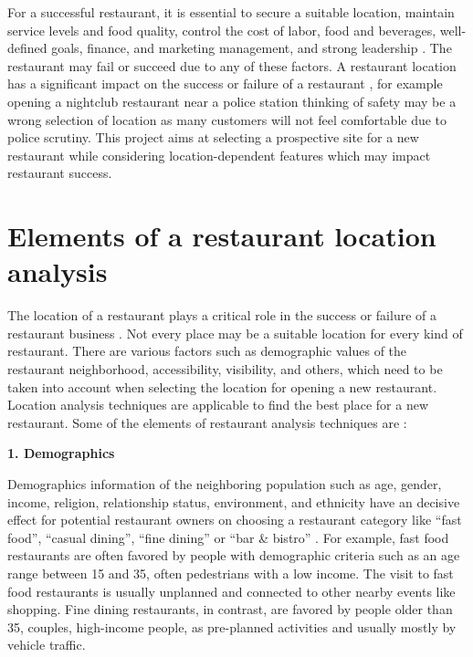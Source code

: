 \documentclass[a4paper, 11pt, oneside]{Thesis}  %
\begin{document}
For a successful restaurant, it is essential to secure a suitable location, maintain service levels and food quality, control the cost of labor, food and beverages, well-defined goals, finance, and marketing management, and strong leadership \cite{Parsa.2005}. The restaurant may fail or succeed due to any of these factors. A restaurant location has a significant impact on the success or failure of a restaurant , for example opening a nightclub restaurant near a police station thinking of safety may be a wrong selection of location as many customers will not feel comfortable due to police scrutiny. This project aims at selecting a prospective site for a new restaurant while considering location-dependent features which may impact restaurant success.

\section{Elements of a restaurant location analysis}
\label{elements}


The location of a restaurant plays a critical role in the success or failure of a restaurant business \cite{Parsa.2005} \cite{Tzeng.2002} \cite{Camillo.2008}. Not every place may be a suitable location for every kind of restaurant. There are various factors such as demographic values of the restaurant neighborhood, accessibility, visibility, and others, which need to be taken into account when selecting the location for opening a new restaurant. Location analysis techniques are applicable to find the best place for a new restaurant. Some of the elements of restaurant analysis techniques are \cite{EvanTarver.21.04.2017} \cite{Webstaurantstore.com.25.07.2018}:


 \textbf{1.	Demographics}

Demographics information of the neighboring population such as age, gender, income, religion, relationship status, environment, and ethnicity have an decisive effect for potential restaurant owners on choosing a restaurant category like “fast food”, “casual dining”, “fine dining” or “bar \& bistro” \cite{EvanTarver.21.04.2017}. For example, fast food restaurants are often favored by people with demographic criteria such as an age range between 15 and 35, often pedestrians with a low income. The visit to fast food restaurants is usually unplanned and connected to other nearby events like shopping. Fine dining restaurants, in contrast, are favored by people older than 35, couples, high-income people, as pre-planned activities and usually mostly by vehicle traffic.
\end{document}
